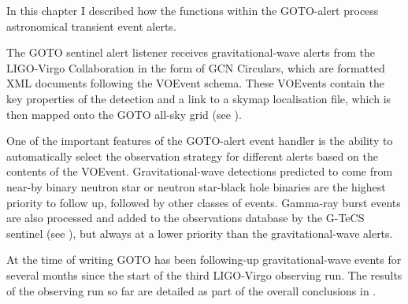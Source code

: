 \begin{colsection}

In this chapter I described how the functions within the GOTO-alert process astronomical transient event alerts.

The GOTO sentinel alert listener receives gravitational-wave alerts from the LIGO-Virgo Collaboration in the form of GCN Circulars, which are formatted XML documents following the VOEvent schema. These VOEvents contain the key properties of the detection and a link to a skymap localisation file, which is then mapped onto the GOTO all-sky grid (see ).

One of the important features of the GOTO-alert event handler is the ability to automatically select the observation strategy for different alerts based on the contents of the VOEvent. Gravitational-wave detections predicted to come from near-by binary neutron star or neutron star-black hole binaries are the highest priority to follow up, followed by other classes of events. Gamma-ray burst events are also processed and added to the observations database by the G-TeCS sentinel (see ), but always at a lower priority than the gravitational-wave alerts.

At the time of writing GOTO has been following-up gravitational-wave events for several months since the start of the third LIGO-Virgo observing run. The results of the observing run so far are detailed as part of the overall conclusions in .

\end{colsection}

